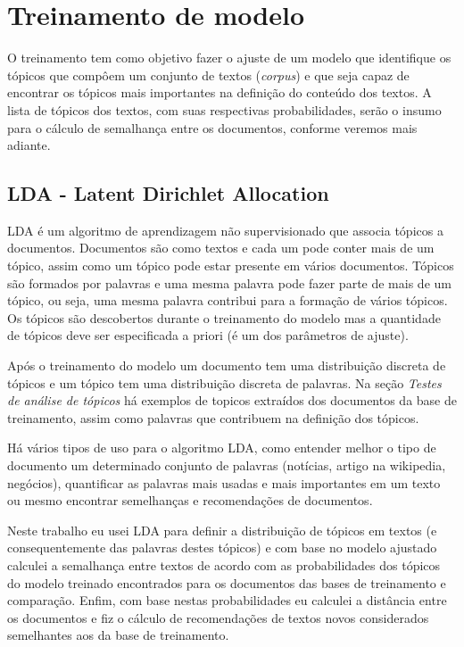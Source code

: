 \section{Treinamento de modelo}

O treinamento tem como objetivo fazer o ajuste de um modelo que identifique os tópicos que compôem um conjunto de textos (\textit{corpus})
e que seja capaz de encontrar os tópicos mais importantes na definição do conteúdo dos textos. A lista de tópicos dos textos, com suas respectivas 
probabilidades, serão o insumo para o cálculo de semalhança entre os documentos, conforme veremos mais adiante.

\subsection{LDA - Latent Dirichlet Allocation}

LDA é um algoritmo de aprendizagem não supervisionado que associa tópicos a documentos. Documentos são como textos e cada um pode conter mais de um 
tópico, assim como um tópico pode estar presente em vários documentos. Tópicos são formados por palavras e uma mesma palavra pode fazer parte de mais de um tópico, ou seja, uma mesma palavra contribui para a formação de vários 
tópicos. Os tópicos são descobertos durante o treinamento do modelo mas a quantidade de tópicos deve ser especificada a priori (é um dos parâmetros de ajuste).

Após o treinamento do modelo um documento tem uma distribuição discreta de tópicos e um tópico tem uma distribuição discreta de palavras. Na seção
\textit{Testes de análise de tópicos} há exemplos de topicos extraídos dos documentos da base de treinamento, assim como palavras que contribuem
na definição dos tópicos.

Há vários tipos de uso para o algoritmo LDA, como entender melhor o tipo de documento um determinado conjunto de palavras (notícias, artigo na wikipedia, 
negócios), quantificar as palavras mais usadas e mais importantes em um texto ou mesmo encontrar semelhanças e recomendações de documentos. 

Neste trabalho eu usei LDA para definir a distribuição de tópicos em textos (e consequentemente das palavras destes tópicos) e com base 
no modelo ajustado calculei a semalhança entre textos de acordo com as probabilidades dos tópicos do modelo treinado encontrados para os documentos
das bases de treinamento e comparação. Enfim, com base nestas probabilidades eu calculei a distância entre os documentos e 
fiz o cálculo de recomendações de textos novos considerados semelhantes aos da base de treinamento.

